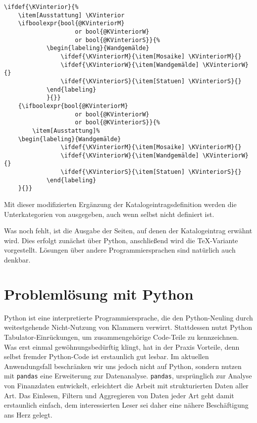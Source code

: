 \documentclass[ngerman]{dtk}
\begin{document}
\begin{lstlisting}[style=number,caption={Einsetzten der Booleschen Operatoren in den Katalogeintrag},label={lis:cat-bool3}]
\ifdef{\KVinterior}{%
	\item[Ausstattung] \KVinterior 
	\ifboolexpr{bool{@KVinteriorM} 
					or bool{@KVinteriorW} 
					or bool{@KVinteriorS}}{%
			\begin{labeling}{Wandgemälde}
				\ifdef{\KVinteriorM}{\item[Mosaike] \KVinteriorM}{}
				\ifdef{\KVinteriorW}{\item[Wandgemälde] \KVinteriorW}{}
				\ifdef{\KVinteriorS}{\item[Statuen] \KVinteriorS}{}
			\end{labeling}
			}{}}
	{\ifboolexpr{bool{@KVinteriorM} 
					or bool{@KVinteriorW} 
					or bool{@KVinteriorS}}{%
		\item[Ausstattung]%
	\begin{labeling}{Wandgemälde}	
				\ifdef{\KVinteriorM}{\item[Mosaike] \KVinteriorM}{}
				\ifdef{\KVinteriorW}{\item[Wandgemälde] \KVinteriorW}{}
				\ifdef{\KVinteriorS}{\item[Statuen] \KVinteriorS}{}
			\end{labeling}
	}{}}
\end{lstlisting}
Mit dieser modifizierten Ergänzung der Katalogeintragsdefinition werden die Unterkategorien von  ausgegeben, 
auch wenn  selbst nicht definiert ist.


Was noch fehlt, ist die Ausgabe der Seiten, auf denen der Katalogeintrag erwähnt wird. 
Dies erfolgt zunächst über Python, anschließend wird die \TeX -Variante vorgestellt.
Lösungen über andere Programmiersprachen sind natürlich auch denkbar.

\section{Problemlösung mit Python}
Python ist eine interpretierte Programmiersprache, die den Python-Neuling
durch weitestgehende Nicht-Nutzung von Klammern verwirrt. 
Stattdessen nutzt Python Tabulator-Einrückungen, um zusammengehörige 
Code-Teile zu kennzeichnen. Was erst einmal gewöhnungsbedürftig klingt, 
hat in der Praxis Vorteile, denn selbst fremder Python-Code ist erstaunlich gut lesbar. 
Im aktuellen Anwendungsfall beschränken wir uns jedoch nicht auf Python, 
sondern nutzen mit  \verb|pandas| eine Erweiterung zur Datenanalyse. 
\verb|pandas|, ursprünglich zur Analyse von Finanzdaten entwickelt, 
erleichtert die Arbeit mit strukturierten Daten aller Art. 
Das Einlesen, Filtern und Aggregieren von Daten jeder Art geht damit 
erstaunlich einfach, dem interessierten Leser sei daher eine nähere Beschäftigung 
ans Herz gelegt.
\end{document}
